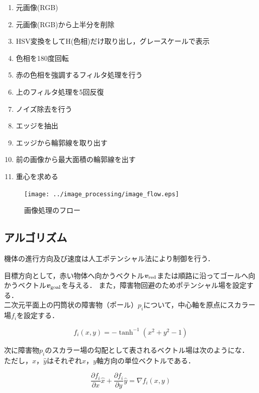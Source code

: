 \documentclass[11pt,a4]{jsarticle}
\begin{document}
\begin{enumerate}
 \item 元画像(RGB)
 \item 元画像(RGB)から上半分を削除
 \item HSV変換をしてH(色相)だけ取り出し，グレースケールで表示
 \item 色相を180度回転
 \item 赤の色相を強調するフィルタ処理を行う
 \item 上のフィルタ処理を5回反復
 \item ノイズ除去を行う
 \item エッジを抽出
 \item エッジから輪郭線を取り出す
 \item 前の画像から最大面積の輪郭線を出す
 \item 重心を求める
\end{enumerate}

\begin{figure}[h]
  \begin{flushleft}
    \texttt{[image: ../image\_processing/image\_flow.eps]}
    \caption{画像処理のフロー}
    \label{image_flow}
  \end{flushleft}
\end{figure}

\newpage
\subsection{アルゴリズム} 

  機体の進行方向及び速度は人工ポテンシャル法により制御を行う．

  目標方向として，赤い物体へ向かうベクトル$\bm{v}_{\rm{red}}$または順路に沿ってゴールへ向かうベクトル$\bm{v}_{\rm{goal}}$を与える．
  また，障害物回避のためポテンシャル場を設定する．\\

  二次元平面上の円筒状の障害物（ポール）$p_i$について，中心軸を原点にスカラー場$f_i$を設定する．

  \begin{equation}
    f_i(x,y) = - \tanh^{-1}(x^2 + y^2 - 1)
  \end{equation}

  次に障害物$p_i$のスカラー場の勾配として表されるベクトル場は次のようにな．
  ただし，$\hat{x}$，$\hat{y}$はそれぞれ$x$，$y$軸方向の単位ベクトルである．

  \begin{equation}
    \frac{\partial f_i}{\partial x}\hat{x} + \frac{\partial f_i}{\partial y}\hat{y} = \nabla f_i(x,y)
  \end{equation}
\end{document}
